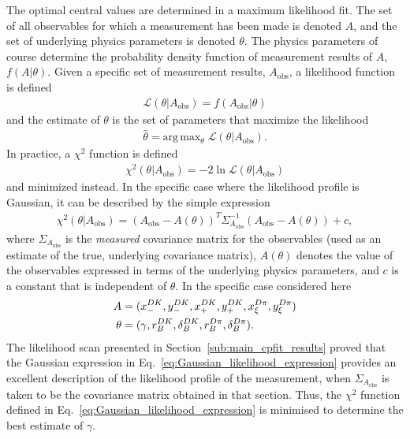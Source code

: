 The optimal central values are determined in a maximum likelihood fit. The set of all observables for which a measurement has been made is denoted $A$, and the set of underlying physics parameters is denoted $\theta$. The physics parameters of course determine the probability density function of measurement results of $A$, $f(A|\theta)$. Given a specific set of measurement results, $A_\mathrm{obs}$, a likelihood function is defined
\begin{align}
    \mathcal L (\theta | A_\mathrm{obs}) = f(A_\mathrm{obs}|\theta)
\end{align}
and the estimate of $\theta$ is the set of parameters that maximize the likelihood
\begin{align}
    \hat \theta = \text{arg}\,\text{max}_\theta \; \mathcal L(\theta|A_\mathrm{obs}).
\end{align} In practice, a $\chi^2$ function is defined
\begin{align}
    \chi^2(\theta | A_\mathrm{obs})= -2\ln \mathcal L (\theta | A_\mathrm{obs})
\end{align}
and minimized instead. In the specific case where the likelihood profile is Gaussian, it can be described by the simple expression
\begin{align}\label{eq:Gaussian_likelihood_expression}
    \chi^2(\theta | A_\mathrm{obs}) = \left(A_\mathrm{obs} - A(\theta)\right)^T \Sigma_{A_\mathrm{obs}}^{-1}\left(A_\mathrm{obs} - A(\theta)\right) + c,
\end{align}
where $\Sigma_{A_\mathrm{obs}}$ is the \emph{measured} covariance matrix for the observables (used as an estimate of the true, underlying covariance matrix), $A(\theta)$ denotes the value of the observables expressed in terms of the underlying physics parameters, and $c$ is a constant that is independent of $\theta$. In the specific case considered here
\begin{align}
\begin{split}
        A&=(x_-^{{D}{K}}, y_-^{{D}{K}}, x_+^{{D}{K}}, y_+^{{D}{K}}, x_\xi^{{D}\pi}, y_\xi^{{D}\pi}) \\ 
        \theta &= (\gamma, r_B^{DK}, \delta_B^{DK}, r_B^{{D}\pi}, \delta_B^{{D}\pi}).
\end{split}
\end{align}
The likelihood scan presented in Section~\ref{sub:main_cpfit_results} proved that the Gaussian expression in Eq.~\eqref{eq:Gaussian_likelihood_expression} provides an excellent description of the likelihood profile of the measurement, when $\Sigma_{A_\mathrm{obs}}$ is taken to be the covariance matrix obtained in that section. Thus, the $\chi^2$ function defined in Eq.~\eqref{eq:Gaussian_likelihood_expression} is minimised to determine the best estimate of $\gamma$. 

